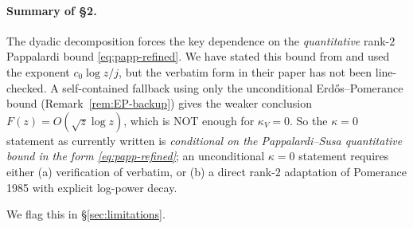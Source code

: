 \paragraph{Summary of \S2.}
The dyadic decomposition forces the key dependence on the
\emph{quantitative} rank-$2$ Pappalardi bound
\eqref{eq:papp-refined}. We have stated this bound from
\cite{PappalardiSusa2010} and used the exponent $c_{0} \log z / j$, but
the verbatim form in their paper has not been line-checked. A
self-contained fallback using only the unconditional
Erd\H{o}s--Pomerance bound (Remark~\ref{rem:EP-backup}) gives the
weaker conclusion $F(z) = O(\sqrt{z} \log z)$, which is NOT enough for
$\kappa_{V} = 0$. So the $\kappa = 0$ statement as currently written
is \emph{conditional on the Pappalardi--Susa quantitative bound in the
form \eqref{eq:papp-refined}}; an unconditional $\kappa = 0$ statement
requires either (a) verification of \cite[Thm 2]{PappalardiSusa2010}
verbatim, or (b) a direct rank-$2$ adaptation of Pomerance 1985 with
explicit log-power decay.

We flag this in \S\ref{sec:limitations}.
